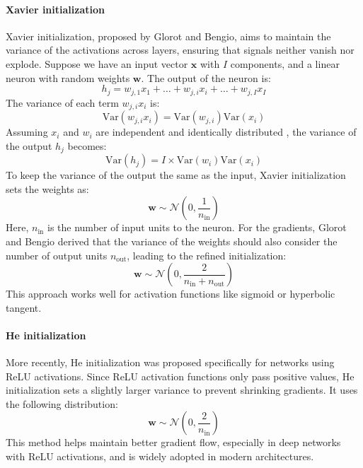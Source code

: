 \paragraph*{Xavier initialization}
Xavier initialization, proposed by Glorot and Bengio, aims to maintain the variance of the activations across layers, ensuring that signals neither vanish nor explode.
Suppose we have an input vector $\mathbf{x}$ with $I$ components, and a linear neuron with random weights $\mathbf{w}$. 
The output of the neuron is:
\[h_j=w_{j,1}x_1+\dots+w_{j,i}x_i+\dots+w_{j,I}x_I\]
The variance of each term $w_{j,i}x_i$ is:
\[\text{Var}(w_{j,i}x_i)=\text{Var}(w_{j,i})\text{Var}(x_i)\]
Assuming $x_i$ and $w_i$ are independent and identically distributed , the variance of the output $h_j$ becomes:
\[\text{Var}(h_j)=I\times\text{Var}(w_i)\text{Var}(x_i)\]
To keep the variance of the output the same as the input, Xavier initialization sets the weights as:
\[\mathbf{w}\sim \mathcal{N}\left(0,\frac{1}{n_{\text{in}}}\right)\]
Here, $n_{\text{in}}$ is the number of input units to the neuron.
For the gradients, Glorot and Bengio derived that the variance of the weights should also consider the number of output units $n_{\text{out}}$, leading to the refined initialization:
\[\mathbf{w}\sim \mathcal{N}\left(0,\frac{2}{n_{\text{in}}+n_{\text{out}}}\right)\]
This approach works well for activation functions like sigmoid or hyperbolic tangent.

\paragraph*{He initialization}
More recently, He initialization was proposed specifically for networks using ReLU activations. 
Since ReLU activation functions only pass positive values, He initialization sets a slightly larger variance to prevent shrinking gradients. 
It uses the following distribution:
\[\mathbf{w}\sim \mathcal{N}\left(0,\frac{2}{n_{\text{in}}}\right)\]
This method helps maintain better gradient flow, especially in deep networks with ReLU activations, and is widely adopted in modern architectures.